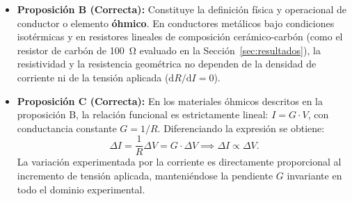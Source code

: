 \begin{appendices}
\begin{itemize}
    Dado que el tungsteno posee un coeficiente térmico de resistividad positivo ($\alpha \approx \qty{4,5e-3}{\per\kelvin}$), su resistividad a temperaturas de operación satisface $\rho(T) \approx \rho_0 (T/T_0)^{1{,}2}$, lo que incrementa la resistencia estática en caliente entre un factor de 12 y 16 veces respecto a la medida en frío ($R_{\text{caliente}} \approx \qtyrange{18}{25}{\ohm}$). En consecuencia, la corriente máxima estacionaria real es de tan solo:
    \begin{equation}
        I_{\text{max}} = \frac{V_{\text{nom}}}{R_{\text{caliente}}} \approx \frac{\qty{12}{\volt}}{\qty{20}{\ohm}} \approx \qty{0,6}{\ampere},
    \end{equation}
    un valor más de trece veces inferior a \qty{8}{\ampere}. Además, una corriente continua sostenida de \qty{8}{\ampere} a \qty{12}{\volt} representaría una potencia disipada de $P = V I = \qty{96}{\watt}$, la cual provocaría la fusión y evaporación instantánea del filamento de una bombilla didáctica de laboratorio (cuyas potencias nominales de diseño oscilan típicamente entre \qtyrange{3}{6}{\watt}).
    
    \item \textbf{Proposición B (Correcta):} Constituye la definición física y operacional de conductor o elemento \textbf{óhmico}. En conductores metálicos bajo condiciones isotérmicas y en resistores lineales de composición cerámico-carbón (como el resistor de carbón de \qty{100}{\ohm} evaluado en la Sección~\ref{sec:resultados}), la resistividad y la resistencia geométrica no dependen de la densidad de corriente ni de la tensión aplicada ($\mathrm{d}R/\mathrm{d}I = 0$).
    
    \item \textbf{Proposición C (Correcta):} En los materiales óhmicos descritos en la proposición B, la relación funcional es estrictamente lineal: $I = G \cdot V$, con conductancia constante $G = 1/R$. Diferenciando la expresión se obtiene:
    \begin{equation}
        \Delta I = \frac{1}{R} \Delta V = G \cdot \Delta V \implies \Delta I \propto \Delta V.
    \end{equation}
    La variación experimentada por la corriente es directamente proporcional al incremento de tensión aplicada, manteniéndose la pendiente $G$ invariante en todo el dominio experimental.
    

\end{itemize}
\end{appendices}

